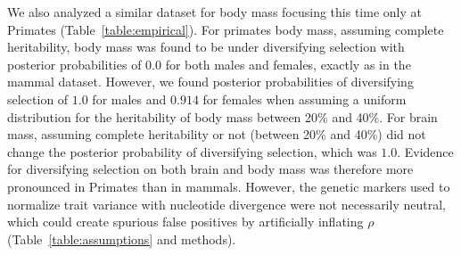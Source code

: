\documentclass{article}
\newcommand{\NI}{\rho}
\begin{document}
We also analyzed a similar dataset for body mass focusing this time only at Primates (Table~\ref{table:empirical}).
For primates body mass, assuming complete heritability, body mass was found to be under diversifying selection with posterior probabilities of $0.0$ for both males and females, exactly as in the mammal dataset.
However, we found posterior probabilities of diversifying selection of $1.0$ for males and $0.914$ for females when assuming a uniform distribution for the heritability of body mass between 20\% and 40\%.
For brain mass, assuming complete heritability or not (between 20\% and 40\%) did not change the posterior probability of diversifying selection, which was $1.0$.
Evidence for diversifying selection on both brain and body mass was therefore more pronounced in Primates than in mammals.
However, the genetic markers used to normalize trait variance with nucleotide divergence were not necessarily neutral, which could create spurious false positives by artificially inflating $\NI$ (Table~\ref{table:assumptions} and methods).
\end{document}
